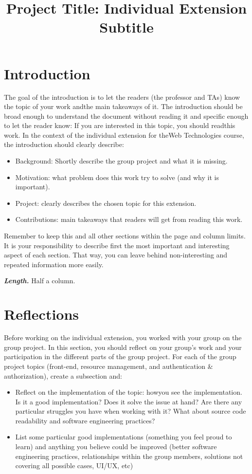 \documentclass[letterpaper,twocolumn]{article}
\title{Project Title: Individual Extension Subtitle}
\date{}
\newcommand{\myparagraph}[1]{\vspace{0.1cm}\noindent \textbf{\textit{#1.}}}
\begin{document}
\maketitle

\section{Introduction}

The goal of the introduction is to let the readers (the professor and TAs) know the topic of your work andthe main takeaways of it.
The introduction should be broad enough to understand the document without reading it and specific enough to let the reader know: 
If you are interested in this topic, you should readthis work.
In the context of the individual extension for theWeb Technologies course, the introduction should clearly describe:

\begin{itemize}
    \item Background: Shortly describe the group project and what it is missing.
    \item Motivation: what problem does this work try to solve (and why it is important).
    \item Project: clearly describes the chosen topic for this extension.
    \item Contributions: main takeaways that readers will get from reading this work.
\end{itemize}


Remember to keep this and all other sections within the page and column limits. 
It is your responsibility to describe first the most important and interesting aspect of each section. 
That way, you can leave behind non-interesting and repeated information more easily.

\myparagraph{Length} Half a column.

\section{Reflections}

Before working on the individual extension, you worked with your group on the group project. 
In this section, you should reflect on your group's work and your participation in the different parts of the group project. 
For each of the group project topics (front-end, resource management, and authentication & authorization), create a subsection and:
\begin{itemize}
  \item Reflect on the implementation of the topic: howyou see the implementation. Is it a good implementation? Does it solve the issue at hand? Are there any particular struggles you have when working with it? What about source code readability and software engineering practices?
  \item List some particular good implementations (something you feel proud to learn) and anything you believe could be improved (better software engineering practices, relationships within the group members, solutions not covering all possible cases, UI/UX, etc)
\end{itemize}
\end{document}
